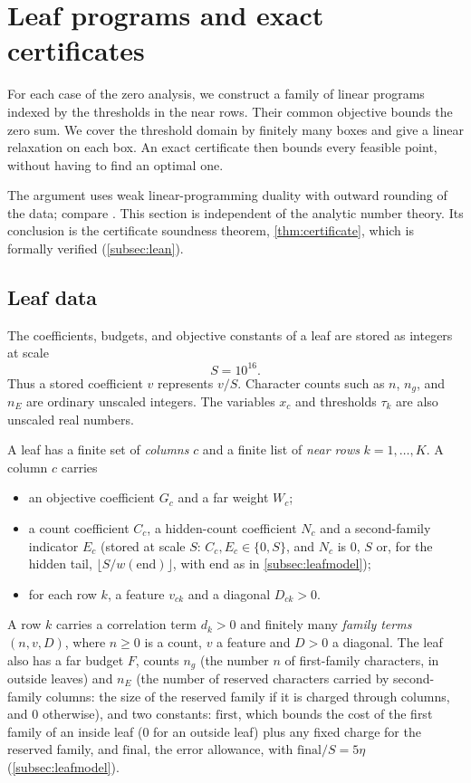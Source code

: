 \documentclass[11pt]{amsart}
\numberwithin{equation}{section}
\theoremstyle{plain}
\theoremstyle{definition}
\theoremstyle{remark}
\newcommand{\1}{\mathbf{1}}
\begin{document}
\section{Leaf programs and exact certificates}\label{sec:lp}

For each case of the zero analysis, we construct a family of linear programs indexed by
the thresholds in the near rows. Their common objective bounds the zero sum. We cover
the threshold domain by finitely many boxes and give a linear relaxation on each box.
An exact certificate then bounds every feasible point, without having to find an
optimal one.

The argument uses weak linear-programming duality
\cite{Chvatal1983linear,Schrijver1986theory} with outward rounding of the data; compare
\cite{Jansson2004rigorous,NeumaierShcherbina2004safe,ApplegateCookDashEspinoza2007exact}.
This section is independent of the analytic number theory. Its conclusion is the
certificate soundness theorem, \cref{thm:certificate}, which is formally verified
(\cref{subsec:lean}).

\subsection{Leaf data}\label{subsec:leafdata}
The coefficients, budgets, and objective constants of a leaf are stored as integers
at scale
\[
  S=10^{16}.
\]
Thus a stored coefficient $v$ represents $v/S$. Character counts such as $n$, $n_g$,
and $n_E$ are ordinary unscaled integers. The variables $x_c$ and thresholds $\tau_k$
are also unscaled real numbers.

A leaf has a finite set of \emph{columns} $c$ and a finite list of \emph{near rows}
$k=1,\dots,K$. A column $c$ carries
\begin{itemize}
  \item an objective coefficient $G_c$ and a far weight $W_c$;
  \item a count coefficient $C_c$, a hidden-count coefficient $N_c$ and a second-family indicator
    $E_c$ (stored at scale $S$: $C_c,E_c\in\{0,S\}$, and $N_c$ is $0$, $S$ or, for the hidden tail,
    $\lfloor S/w(\mathrm{end})\rfloor$, with $\mathrm{end}$ as in \cref{subsec:leafmodel});
  \item for each row $k$, a feature $v_{ck}$ and a diagonal $D_{ck}>0$.
\end{itemize}
A row $k$ carries a correlation term $d_k>0$ and finitely many \emph{family terms} $(n,v,D)$, where
$n\ge0$ is a count, $v$ a feature and $D>0$ a diagonal. The leaf also has a far budget $F$, counts $n_g$ (the number $n$ of first-family characters, in
outside leaves) and $n_E$ (the number of reserved characters carried by second-family columns: the
size of the reserved family if it is charged through columns, and $0$ otherwise), and two
constants: $\mathrm{first}$, which bounds the cost of the first family of an inside leaf ($0$ for an
outside leaf) plus any fixed charge for the reserved family, and $\mathrm{final}$, the error
allowance, with $\mathrm{final}/S=5\eta$ (\cref{subsec:leafmodel}).
\end{document}
